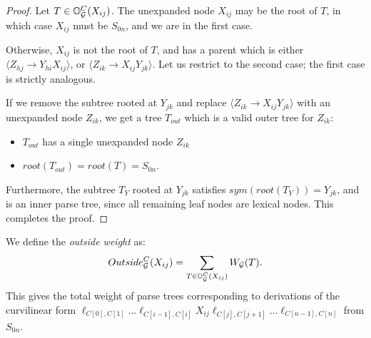 \begin{proof}
  Let $T\in \mathbb{O}_{{\mathcal G}}^C(X_{ij})$. The unexpanded
  node $X_{ij}$ may be the root of $T$, in which case $X_{ij}$ must be
  $S_{0n}$, and we are in the first case.

  Otherwise, $X_{ij}$ is not the root of $T$, and has a parent which
  is either $\langle Z_{hj} \to Y_{hi} X_{ij} \rangle$, or $\langle
  Z_{ik} \to X_{ij} Y_{jk} \rangle$. Let us restrict to the second
  case; the first case is strictly analogous. 
  
  If we remove the subtree rooted at $Y_{jk}$ and replace $\langle
  Z_{ik} \to X_{ij} Y_{jk} \rangle$ with an unexpanded node $Z_{ik}$, we get a
  tree $T_{out}$ which is a valid outer tree for $Z_{ik}$:
  \begin{itemize}
  \item $T_{out}$ has a single unexpanded node $Z_{ik}$
  \item $root(T_{out}) = root(T) = S_{0n}$.
  \end{itemize}
  Furthermore, the subtree $T_Y$ rooted at $Y_{jk}$ satisfies
  $sym(root(T_Y)) = Y_{jk}$, and is an inner parse tree, since all
  remaining leaf nodes are lexical nodes. This completes the proof.
  
\end{proof}

We define the \emph{outside weight} as:
$$Outside_{{\mathcal G}}^C(X_{ij}) = \sum_{T\in \mathbb{O}_{{\mathcal G}}^C(X_{ij})}
W_{{\mathcal G}}(T).$$ This gives the total weight of parse trees corresponding
to derivations of the curvilinear form $\ell_{C[0], C[1]}\dots
\ell_{C[i-1],C[i]} X_{ij} \ell_{C[j], C[j+1]} \dots \ell_{C[n-1],
  C[n]}$ from $S_{0n}$.

